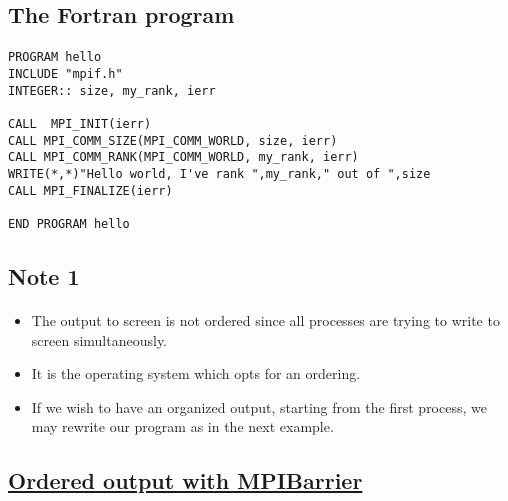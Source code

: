 \documentclass[%
oneside,                 %
final,                   %
10pt]{article}
\begin{document}
\subsection*{The Fortran program}

\paragraph{}
\begin{Verbatim}[numbers=none,fontsize=\fontsize{9pt}{9pt},baselinestretch=0.95]
PROGRAM hello
INCLUDE "mpif.h"
INTEGER:: size, my_rank, ierr

CALL  MPI_INIT(ierr)
CALL MPI_COMM_SIZE(MPI_COMM_WORLD, size, ierr)
CALL MPI_COMM_RANK(MPI_COMM_WORLD, my_rank, ierr)
WRITE(*,*)"Hello world, I've rank ",my_rank," out of ",size
CALL MPI_FINALIZE(ierr)

END PROGRAM hello
\end{Verbatim}




\subsection*{Note 1}

\paragraph{}

\begin{itemize}
\item The output to screen is not ordered since all processes are trying to write  to screen simultaneously.

\item It is the operating system which opts for an ordering.  

\item If we wish to have an organized output, starting from the first process, we may rewrite our program as in the next example.
\end{itemize}

\noindent




\subsection*{\href{{https://github.com/CompPhysics/ComputationalPhysics2/blob/gh-pages/doc/Programs/LecturePrograms/programs/MPI/chapter07/program3.cpp}}{Ordered output with MPIBarrier}}
\end{document}

